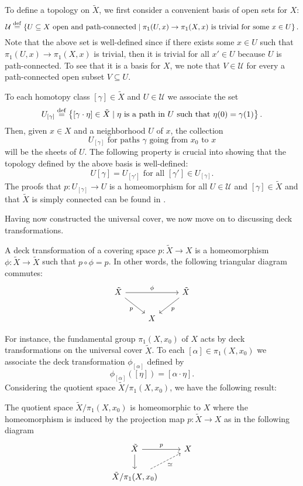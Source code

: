 \documentclass{report}
\begin{document}
To define a topology on $\tilde X$, we first consider a convenient basis of open sets for $X$:
\[
\mathcal U \overset{\mathrm{def}}{=} \left\{ U \subseteq X \text{ open and path-connected} \mid \pi_1(U, x) \to \pi_1(X,x) \text{ is trivial for some } x \in U \right\}.
\]
Note that the above set is well-defined since if there exists some $x\in U$ such that $\pi_1(U,x) \to \pi_1(X,x)$ is trivial, then it is trivial for all $x' \in U$ because $U$ is path-connected.
To see that it is a basis for $X$,  we note that $V \in \mathcal U$ for every a path-connected open subset $V\subseteq U$.

To each homotopy class $[\gamma] \in \tilde X$ and $U \in \mathcal U$ we associate the set
\[
U_{[\gamma]} \overset{\mathrm{def}}{=} \left\{ [\gamma \cdot \eta] \in \tilde X \mid \eta \text{ is a path in } U \text{ such that } \eta(0) = \gamma(1) \right\}.
\]
Then, given $x \in X$ and a neighborhood $U$ of $x$, the collection
\[
U_{[\gamma]} \text{ for paths } \gamma \text{ going from } x_0 \text{ to } x  
\]
will be the sheets of $U$.
The following property is crucial into showing that the topology defined by the above basis is well-defined:
\[
U[\gamma] = U_[\gamma'] \text{ for all } [\gamma'] \in U_{[\gamma]}.
\]
The proofs that $p:U_[\gamma] \to U$ is a homeomorphism for all $U \in \mathcal U$ and $[\gamma] \in \tilde X$ and that $\tilde X$ is simply connected can be found in \cite{hatcher2002topology}.

Having now constructed the universal cover, we now move on to discussing deck transformations.
\begin{definition}
    A deck transformation of a covering space $p: \tilde X \to X$ is a homeomorphism $\phi: \tilde X \to \tilde X$ such that $p \circ \phi = p$.
    In other words, the following triangular diagram commutes:
    \[
    \begin{tikzcd}
        \tilde X \arrow[rr, "\phi"] \arrow[rd, "p"'] & & \tilde X \arrow[ld, "p"] \\
        & X &
    \end{tikzcd}
    \]
\end{definition}
For instance, the fundamental group $\pi_1(X, x_0)$ of $X$ acts by deck transformations on the universal cover $\tilde X$.
To each $[\alpha] \in \pi_1(X, x_0)$ we associate the deck transformation $\phi_{[\alpha]}$ defined by
\[
\phi_{[\alpha]}([\eta]) = [\alpha \cdot \eta].
\]
Considering the quotient space $\tilde X / \pi_1(X, x_0)$, we have the following result:
\begin{theorem}
    The quotient space $\tilde X / \pi_1(X, x_0)$ is homeomorphic to $X$ where the homeomorphism is induced by the projection map $p: \tilde X \to X$ as in the following diagram
    \[
    \begin{tikzcd}
        \tilde X \arrow[r, "p"] \arrow[d] & X \\
        \tilde X / \pi_1(X, x_0) \arrow[ur, "\simeq"', dashed]
    \end{tikzcd}
    \]
\end{theorem}
\printbibliography
\end{document}
